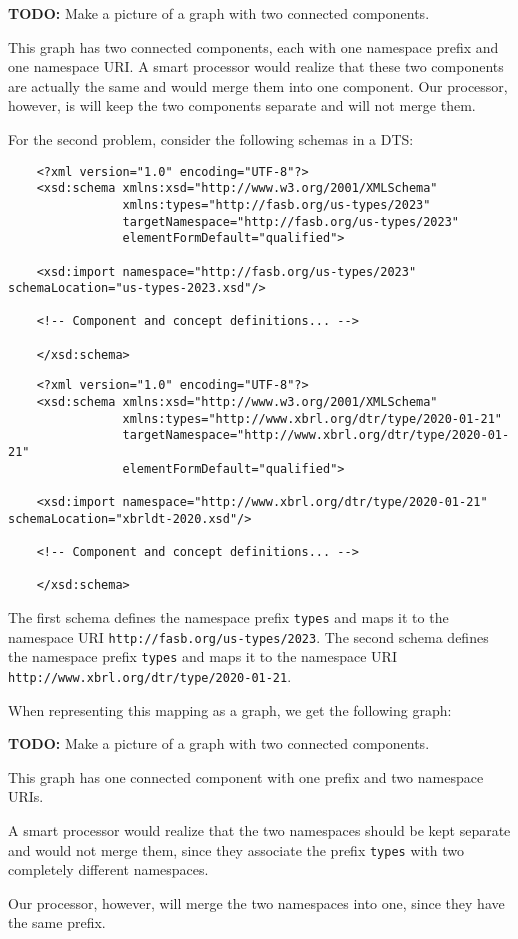 \textbf{TODO:} Make a picture of a graph with two connected components.

This graph has two connected components, each with one namespace prefix and one namespace URI.
A smart processor would realize that these two components are actually the same and would merge them into one component.
Our processor, however, is will keep the two components separate and will not merge them.

For the second problem, consider the following schemas in a DTS:

\begin{lstlisting}
    <?xml version="1.0" encoding="UTF-8"?>
    <xsd:schema xmlns:xsd="http://www.w3.org/2001/XMLSchema"
                xmlns:types="http://fasb.org/us-types/2023"
                targetNamespace="http://fasb.org/us-types/2023"
                elementFormDefault="qualified">
    
    <xsd:import namespace="http://fasb.org/us-types/2023" schemaLocation="us-types-2023.xsd"/>

    <!-- Component and concept definitions... -->

    </xsd:schema>
\end{lstlisting}

\begin{lstlisting}
    <?xml version="1.0" encoding="UTF-8"?>
    <xsd:schema xmlns:xsd="http://www.w3.org/2001/XMLSchema"
                xmlns:types="http://www.xbrl.org/dtr/type/2020-01-21"
                targetNamespace="http://www.xbrl.org/dtr/type/2020-01-21"
                elementFormDefault="qualified">
    
    <xsd:import namespace="http://www.xbrl.org/dtr/type/2020-01-21" schemaLocation="xbrldt-2020.xsd"/>

    <!-- Component and concept definitions... -->

    </xsd:schema>
\end{lstlisting}

The first schema defines the namespace prefix \texttt{types} and maps it to the namespace URI \texttt{http://fasb.org/us-types/2023}.
The second schema defines the namespace prefix \texttt{types} and maps it to the namespace URI \texttt{http://www.xbrl.org/dtr/type/2020-01-21}.

When representing this mapping as a graph, we get the following graph:

\textbf{TODO:} Make a picture of a graph with two connected components.

This graph has one connected component with one prefix and two namespace URIs.

A smart processor would realize that the two namespaces should be kept separate and would not merge them, 
since they associate the prefix \texttt{types} with two completely different namespaces.

Our processor, however, will merge the two namespaces into one, since they have the same prefix.